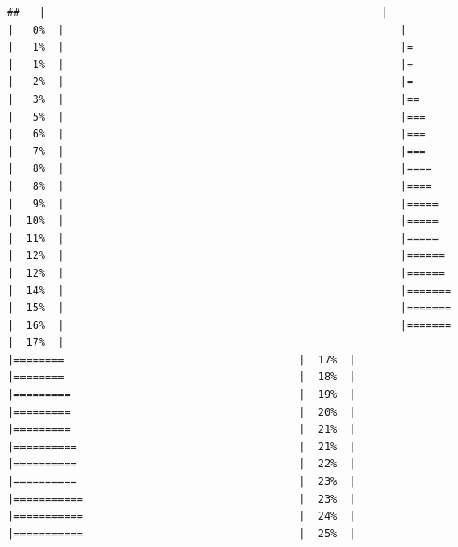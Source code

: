 \documentclass[
  krantz2]{krantz}
\begin{document}
\begin{verbatim}
##   |                                                     |                                             |   0%  |                                                     |                                             |   1%  |                                                     |=                                            |   1%  |                                                     |=                                            |   2%  |                                                     |=                                            |   3%  |                                                     |==                                           |   5%  |                                                     |===                                          |   6%  |                                                     |===                                          |   7%  |                                                     |===                                          |   8%  |                                                     |====                                         |   8%  |                                                     |====                                         |   9%  |                                                     |=====                                        |  10%  |                                                     |=====                                        |  11%  |                                                     |=====                                        |  12%  |                                                     |======                                       |  12%  |                                                     |======                                       |  14%  |                                                     |=======                                      |  15%  |                                                     |=======                                      |  16%  |                                                     |=======                                      |  17%  |                                                     |========                                     |  17%  |                                                     |========                                     |  18%  |                                                     |=========                                    |  19%  |                                                     |=========                                    |  20%  |                                                     |=========                                    |  21%  |                                                     |==========                                   |  21%  |                                                     |==========                                   |  22%  |                                                     |==========                                   |  23%  |                                                     |===========                                  |  23%  |                                                     |===========                                  |  24%  |                                                     |===========                                  |  25%  |         
\end{verbatim}
\end{document}
